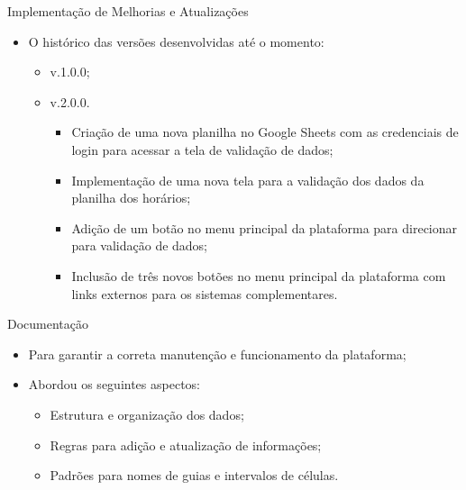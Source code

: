 \begin{frame}{Implementação de Melhorias e Atualizações}
    \begin{itemize}
        \item O histórico das versões desenvolvidas até o momento: \vspace{0.5cm}
              \begin{itemize}
                  \item v.1.0.0; \vspace{0.5cm}
                  \item v.2.0.0. \vspace{0.25cm}
                        \begin{itemize}
                            \item Criação de uma nova planilha no Google Sheets com as credenciais de login para acessar a tela de validação de dados; \vspace{0.25cm}
                            \item Implementação de uma nova tela para a validação dos dados da planilha dos horários; \vspace{0.25cm}
                            \item Adição de um botão no menu principal da plataforma para direcionar para validação de dados; \vspace{0.25cm}
                            \item Inclusão de três novos botões no menu principal da plataforma com links externos para os sistemas complementares. \vspace{0.25cm}
                        \end{itemize}
              \end{itemize}
    \end{itemize}
\end{frame}

\begin{frame}{Documentação}
    \begin{itemize}
        \item Para garantir a correta manutenção e funcionamento da plataforma; \vspace{0.5cm}
        \item Abordou os seguintes aspectos: \vspace{0.5cm}
              \begin{itemize}
                  \item Estrutura e organização dos dados; \vspace{0.5cm}
                  \item Regras para adição e atualização de informações; \vspace{0.5cm}
                  \item Padrões para nomes de guias e intervalos de células.
              \end{itemize}
    \end{itemize}
\end{frame}